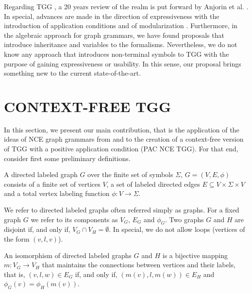 \documentclass[a4paper,twoside]{article}
\begin{document}
Regarding TGG \cite{schurr1994specification}, a 20 years review of the realm is put forward by Anjorin et al. \cite{anjorin201620}. In special, advances are made in the direction of expressiveness with the introduction of application conditions \cite{klar2010extended} and of modularization \cite{anjorin2014modularizing}. Furthermore, in the algebraic approach for graph grammars, we have found proposals that introduce inheritance \cite{bardohl2004integrating,hermann2008typed} and variables \cite{hoffmann2005graph} to the formalisms. Nevertheless, we do not know any approach that introduces non-terminal symbols to TGG with the purpose of gaining expressiveness or usability. In this sense, our proposal brings something new to the current state-of-the-art.

\section{\uppercase{Context-free TGG}}

\noindent In this section, we present our main contribution, that is the application of the ideas of NCE graph grammars from \cite{rozenberg1986boundary} and \cite{janssens1982graph} to the creation of a context-free version of TGG with a positive application condition (PAC NCE TGG). For that end, consider first some preliminary definitions.

\begin{definition}
	\label{def:graph}
	A directed labeled graph $G$ over the finite set of symbols $\Sigma$, $G = (V, E, \phi)$ consists of a finite set of vertices $V$, a set of labeled directed edges $E \subseteq V \times \Sigma \times V$ and a total vertex labeling function $\phi : V \to \Sigma$. 
\end{definition}

We refer to directed labeled graphs often referred simply as graphs. For a fixed graph $G$ we refer to its components as $V_G$, $E_G$ and $\phi_G$. Two graphs $G$ and $H$ are disjoint if, and only if, $V_G \cap V_H = \emptyset$. In special, we do not allow loops (vertices of the form $(v,l,v)$).

\begin{definition}
	An isomorphism of directed labeled graphs $G$ and $H$ is a bijective mapping $m: V_G \to V_H$ that maintains the connections between vertices and their labels, that is, $(v,l,w) \in E_G$ if, and only if, $(m(v),l,m(w)) \in E_H$ and $\phi_G(v) = \phi_H(m(v))$.
\end{definition}
\end{document}
